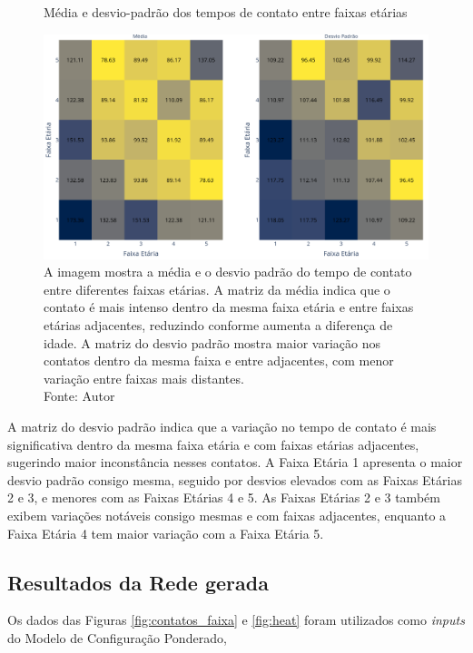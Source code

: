 \begin{figure}[H]
    \centering
    \captionsetup{font=normalsize,skip=0.8pt,singlelinecheck=on,labelsep=endash}
    \caption{Média e desvio-padrão dos tempos de contato entre faixas etárias}
    \includegraphics[scale= 0.32]{figuras/media_std.png}
    \captionsetup{font=small,justification=justified}
    \caption*{A imagem mostra a média e o desvio padrão do tempo de contato entre diferentes faixas etárias. A matriz da média indica que o contato é mais intenso dentro da mesma faixa etária e entre faixas etárias adjacentes, reduzindo conforme aumenta a diferença de idade. A matriz do desvio padrão mostra maior variação nos contatos dentro da mesma faixa e entre adjacentes, com menor variação entre faixas mais distantes. \\Fonte: Autor}
    \label{fig:mediastd}
\end{figure}

A matriz do desvio padrão indica que a variação no tempo de contato é mais significativa dentro da mesma faixa etária e com faixas etárias adjacentes, sugerindo maior inconstância nesses contatos. A Faixa Etária 1 apresenta o maior desvio padrão consigo mesma, seguido por desvios elevados com as Faixas Etárias 2 e 3, e menores com as Faixas Etárias 4 e 5. As Faixas Etárias 2 e 3 também exibem variações notáveis consigo mesmas e com faixas adjacentes, enquanto a Faixa Etária 4 tem maior variação com a Faixa Etária 5.

\subsection{Resultados da Rede gerada}

Os dados das Figuras \ref{fig:contatos_faixa} e \ref{fig:heat} foram utilizados como \textit{inputs} do Modelo de Configuração Ponderado, 

